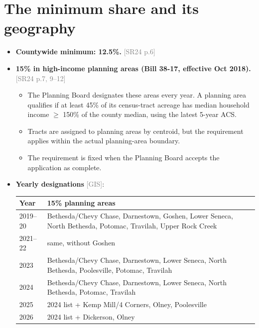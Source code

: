 \documentclass[11pt]{article}
\newcommand{\src}[1]{\textcolor{gray}{\small[#1]}}
\begin{document}
\section{The minimum share and its geography}
\begin{itemize}
  \item \textbf{Countywide minimum: 12.5\%.} \src{SR24 p.6}
  \item \textbf{15\% in high-income planning areas (Bill 38-17, effective Oct 2018).} \src{SR24 p.7, 9--12}
    \begin{itemize}
      \item The Planning Board designates these areas every year. A planning area qualifies if at least 45\% of its census-tract acreage has median household income $\geq$ 150\% of the county median, using the latest 5-year ACS.
      \item Tracts are assigned to planning areas by centroid, but the requirement applies within the actual planning-area boundary.
      \item The requirement is fixed when the Planning Board accepts the application as complete.
    \end{itemize}
  \item \textbf{Yearly designations} \src{GIS}:

  \smallskip
  \begin{tabularx}{\linewidth}{@{}lX@{}}
    \toprule
    Year & 15\% planning areas \\
    \midrule
    2019--20 & Bethesda/Chevy Chase, Darnestown, Goshen, Lower Seneca, North Bethesda, Potomac, Travilah, Upper Rock Creek \\
    2021--22 & same, without Goshen \\
    2023 & Bethesda/Chevy Chase, Darnestown, Lower Seneca, North Bethesda, Poolesville, Potomac, Travilah \\
    2024 & Bethesda/Chevy Chase, Darnestown, Lower Seneca, North Bethesda, Potomac, Travilah \\
    2025 & 2024 list + Kemp Mill/4 Corners, Olney, Poolesville \\
    2026 & 2024 list + Dickerson, Olney \\
    \bottomrule
  \end{tabularx}
  \smallskip


\end{itemize}
\end{document}
